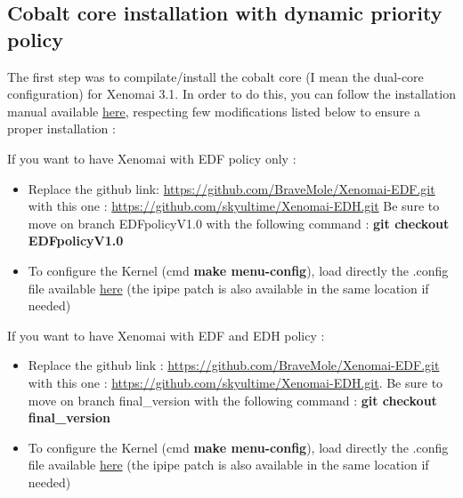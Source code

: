 \documentclass[12pt,hidelinks]{article}
\begin{document}
{    \subsection{Cobalt core installation with dynamic priority policy}
    
    The first step was to compilate/install the cobalt core (I mean the dual-core configuration) for Xenomai 3.1.\newline \newline
    In order to do this, you can follow the installation manual available \href{Doc/CobaltCoreXenomaiInstallation/XenomaiEDF-installationGuide-1.pdf}{here}, respecting few modifications listed below to ensure a proper installation :\newline
    
    If you want to have Xenomai with EDF policy only :
    \begin{itemize}
       \item Replace the github link: \href{https://github.com/BraveMole/Xenomai-EDF.git}{https://github.com/BraveMole/Xenomai-EDF.git} with this one : \href{https://github.com/skyultime/Xenomai-EDH.git}{https://github.com/skyultime/Xenomai-EDH.git} Be sure to move on branch EDFpolicyV1.0 with the following command : \textbf{git checkout EDFpolicyV1.0}
       
       \item To configure the Kernel (cmd \textbf{make menu-config}), load directly the .config file available \href{https://github.com/skyultime/M2_ERTS_Project_Xenomai_edh/tree/dev/SourceCode/Patch/LinuxConfigFiles}{here} (the ipipe patch is also available in the same location if needed)
       
    \end{itemize}
    
    If you want to have Xenomai with EDF and EDH policy :
     \begin{itemize}
       \item Replace the github link : \href{https://github.com/BraveMole/Xenomai-EDF.git}{https://github.com/BraveMole/Xenomai-EDF.git} with this one : \href{https://github.com/skyultime/Xenomai-EDH.git}{https://github.com/skyultime/Xenomai-EDH.git}. Be sure to move on branch final\_version with the following command : \textbf{git checkout final\_version}
       
       \item To configure the Kernel (cmd \textbf{make menu-config}), load directly the .config file available \href{https://github.com/skyultime/M2_ERTS_Project_Xenomai_edh/tree/dev/SourceCode/Patch/LinuxConfigFiles}{here} (the ipipe patch is also available in the same location if needed)
       

\end{itemize}}
\end{document}
